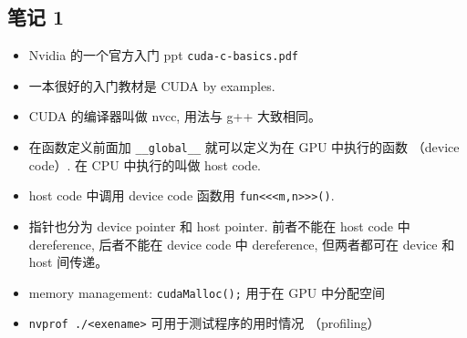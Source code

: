 

\subsection{笔记 1}
\begin{itemize}
\item Nvidia 的一个官方入门 ppt \verb|cuda-c-basics.pdf|
\item 一本很好的入门教材是 CUDA by examples.
\item CUDA 的编译器叫做 nvcc, 用法与 g++ 大致相同。
\item 在函数定义前面加 \verb`__global__` 就可以定义为在 GPU 中执行的函数 （device code）. 在 CPU 中执行的叫做 host code.
\item host code 中调用 device code 函数用 \verb`fun<<<m,n>>>()`.
\item 指针也分为 device pointer 和 host pointer. 前者不能在 host code 中 dereference, 后者不能在 device code 中 dereference, 但两者都可在 device 和 host 间传递。
\item memory management:
\verb`cudaMalloc();` 用于在 GPU 中分配空间
\item \verb`nvprof ./<exename>` 可用于测试程序的用时情况 （profiling）
\end{itemize}

